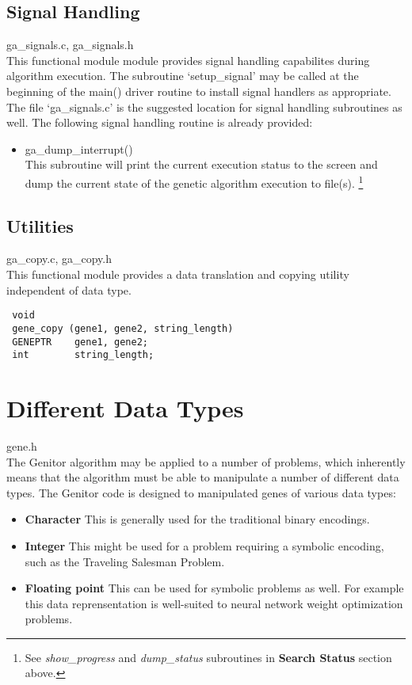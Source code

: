 \subsection{Signal Handling}

ga\_signals.c, ga\_signals.h
\\
This functional module module provides signal handling capabilites
during algorithm execution.  The subroutine `setup\_signal' may be
called at the beginning of the main() driver routine to install
signal handlers as appropriate.  The file `ga\_signals.c' is
the suggested location for signal handling subroutines as well.
The following signal handling routine is already provided:

\begin{itemize}
\item ga\_dump\_interrupt()\\
This subroutine will print the current execution status to the
screen and dump the current state of the genetic algorithm
execution to file(s). \footnote {See {\it show\_progress} and
{\it dump\_status} subroutines in {\bf Search Status} section above.} 
\end{itemize}


\subsection{Utilities}

ga\_copy.c, ga\_copy.h
\\
This functional module provides a data translation and copying
utility independent of data type.
\begin{verbatim}
 void
 gene_copy (gene1, gene2, string_length)
 GENEPTR    gene1, gene2;
 int        string_length;
\end{verbatim}


\newpage

\section{Different Data Types}

gene.h
\\
The Genitor algorithm may be applied to a number of problems, which
inherently means that the algorithm must be able to manipulate a
number of different data types.  The Genitor code is designed to
manipulated genes of various data types:

\begin{itemize}
\item {\bf Character} This is generally used for the traditional
binary encodings.
\item {\bf Integer} This might be used for a problem requiring a
symbolic encoding, such as the Traveling Salesman Problem.
\item {\bf Floating point} This can be used for symbolic problems
as well. For example this data reprensentation is well-suited to
neural network weight optimization problems.
\end{itemize}

